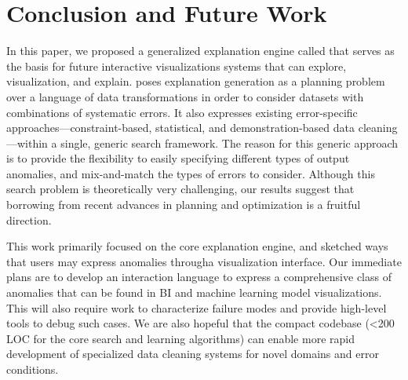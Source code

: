 \section{Conclusion and Future Work}
In this paper, we proposed a generalized explanation engine called \sys that serves as the basis for 
future interactive visualizations systems that can explore, visualization, and explain.
\sys poses explanation generation as a planning problem over a language of data transformations in order to consider datasets with combinations of systematic errors.
It also expresses existing error-specific approaches---constraint-based, statistical, and demonstration-based data cleaning---within a single, generic search framework. 
The reason for this generic approach is to provide the flexibility to easily specifying different types of output anomalies, and mix-and-match the types of errors to consider.
Although this search problem is theoretically very challenging, our results suggest that borrowing from recent advances in planning and optimization is a fruitful direction.  

This work primarily focused on the core explanation engine, and sketched ways that users may express anomalies througha visualization interface.
Our immediate plans are to develop an interaction language to express a comprehensive class of anomalies that can be found in BI and machine learning model visualizations. 
This will also require work to characterize failure modes and provide high-level tools to debug such cases.  
We are also hopeful that the compact codebase (<200 LOC for the core search and learning algorithms) can enable more rapid development of specialized data cleaning systems for novel domains and error conditions.  




% 
% 
